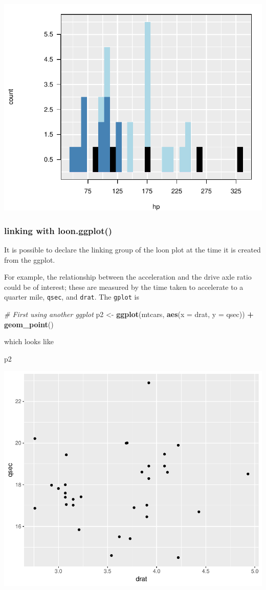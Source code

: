 \documentclass[]{article}
\newenvironment{Shaded}{\begin{snugshade}}{\end{snugshade}}
\newcommand{\KeywordTok}[1]{\textcolor[rgb]{0.13,0.29,0.53}{\textbf{#1}}}
\newcommand{\DataTypeTok}[1]{\textcolor[rgb]{0.13,0.29,0.53}{#1}}
\newcommand{\StringTok}[1]{\textcolor[rgb]{0.31,0.60,0.02}{#1}}
\newcommand{\CommentTok}[1]{\textcolor[rgb]{0.56,0.35,0.01}{\textit{#1}}}
\newcommand{\OperatorTok}[1]{\textcolor[rgb]{0.81,0.36,0.00}{\textbf{#1}}}
\newcommand{\NormalTok}[1]{#1}
\begin{document}
\begin{center}\includegraphics[width=0.7\linewidth]{ggplots2loon_files/figure-latex/stacked colours grid.loon-1} \end{center}

\subsubsection{linking with
loon.ggplot()}\label{linking-with-loon.ggplot}

It is possible to declare the linking group of the loon plot at the time
it is created from the ggplot.

For example, the relationship between the acceleration and the drive
axle ratio could be of interest; these are measured by the time taken to
accelerate to a quarter mile, \texttt{qsec}, and \texttt{drat}. The
\texttt{gplot} is

\begin{Shaded}
\begin{Highlighting}[]
\CommentTok{# First using another ggplot}
\NormalTok{p2 <-}\StringTok{ }\KeywordTok{ggplot}\NormalTok{(mtcars, }\KeywordTok{aes}\NormalTok{(}\DataTypeTok{x =}\NormalTok{ drat, }\DataTypeTok{y =}\NormalTok{ qsec)) }\OperatorTok{+}\StringTok{ }\KeywordTok{geom_point}\NormalTok{()}
\end{Highlighting}
\end{Shaded}

which looks like

\begin{Shaded}
\begin{Highlighting}[]
\NormalTok{p2}
\end{Highlighting}
\end{Shaded}

\begin{center}\includegraphics[width=0.5\linewidth]{ggplots2loon_files/figure-latex/ggplot p2-1} \end{center}
\end{document}
